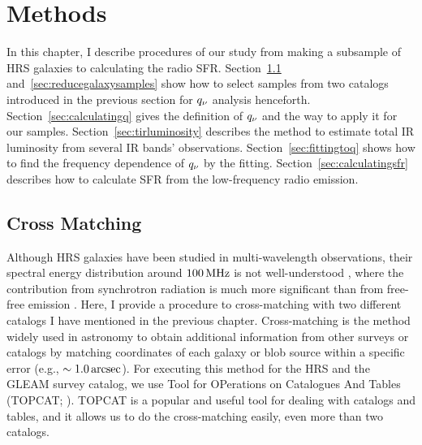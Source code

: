 \chapter{Methods}\label{chap:methods}
\begin{chapabstract}

In this chapter, I describe procedures of our study from making a subsample of HRS galaxies to calculating the radio SFR\@.
Section~\ref{sec:crossmatching} and~\ref{sec:reducegalaxysamples} show how to select samples from two catalogs introduced in the previous section for $q_{\nu}$ analysis henceforth.
Section~\ref{sec:calculatingq} gives the definition of $q_{\nu}$ and the way to apply it for our samples.
Section~\ref{sec:tirluminosity} describes the method to estimate total IR luminosity from several IR bands' observations.
Section~\ref{sec:fittingtoq} shows how to find the frequency dependence of $q_{\nu}$ by the fitting.
Section~\ref{sec:calculatingsfr} describes how to calculate SFR from the low-frequency radio emission.

\end{chapabstract}

\section{Cross Matching}\label{sec:crossmatching}
Although HRS galaxies have been studied in multi-wavelength observations, their spectral energy distribution around $100\,\mathrm{MHz}$ is not well-understood \citep{Ciesla2014}, where the contribution from synchrotron radiation is much more significant than from free-free emission \citep{Condon1992a}.
Here, I provide a procedure to cross-matching with two different catalogs I have mentioned in the previous chapter.
Cross-matching is the method widely used in astronomy to obtain additional information from other surveys or catalogs by matching coordinates of each galaxy or blob source within a specific error (e.g., $\sim 1.0\,\mathrm{arcsec}$).
For executing this method for the HRS and the GLEAM survey catalog, we use Tool for OPerations on Catalogues And Tables (TOPCAT\@; \citealt{Taylor2009}).
TOPCAT is a popular and useful tool for dealing with catalogs and tables, and it allows us to do the cross-matching easily, even more than two catalogs.

